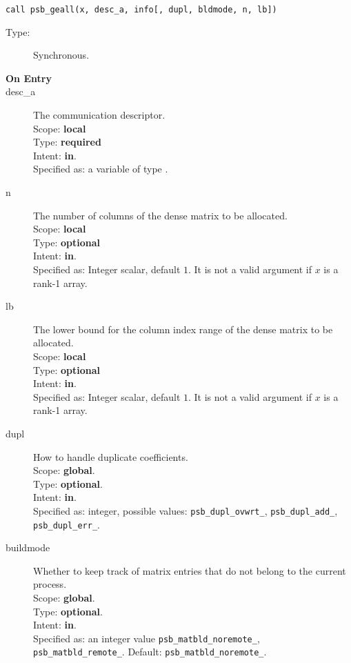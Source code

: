 \begin{verbatim}
call psb_geall(x, desc_a, info[, dupl, bldmode, n, lb])
\end{verbatim}

\begin{description}
\item[Type:] Synchronous.
\item[\bf On Entry]
\item[desc\_a] The communication descriptor.\\
Scope: {\bf local} \\
Type: {\bf required}\\
Intent: {\bf in}.\\
Specified as: a variable of type \descdata.\\
\item[n] The number of columns of the dense matrix to be allocated.\\
Scope: {\bf local} \\
Type: {\bf optional}\\
Intent: {\bf in}.\\
Specified as: Integer scalar, default $1$. It is not a valid argument  if $x$ is a
rank-1 array. 
\item[lb] The lower bound for the column index range of the dense matrix to be allocated.\\
Scope: {\bf local} \\
Type: {\bf optional}\\
Intent: {\bf in}.\\
Specified as: Integer scalar, default $1$. It is not a valid argument if $x$ is a
rank-1 array. 
\item[dupl] How to handle duplicate coefficients.\\
Scope: {\bf global}.\\
Type: {\bf optional}.\\
Intent: {\bf in}.\\
Specified as: integer, possible values: \verb|psb_dupl_ovwrt_|,
\verb|psb_dupl_add_|, \verb|psb_dupl_err_|.
\item[buildmode] Whether to keep track of matrix entries that do not
  belong to the current process.\\ 
Scope: {\bf global}.\\
Type: {\bf optional}.\\
Intent: {\bf in}.\\
Specified as: an integer value \verb|psb_matbld_noremote_|,
\verb|psb_matbld_remote_|.  Default:  \verb|psb_matbld_noremote_|.
\end{description}


